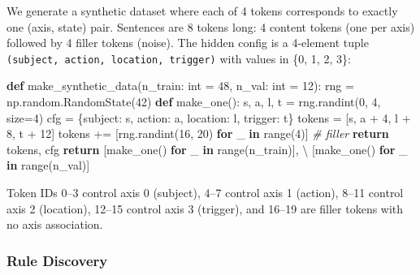 \documentclass[
  twocolumn,
  10pt,
  a4paper]{article}
\newenvironment{Shaded}{}{}
\newcommand{\BuiltInTok}[1]{\textcolor[rgb]{0.00,0.50,0.00}{#1}}
\newcommand{\CommentTok}[1]{\textcolor[rgb]{0.38,0.63,0.69}{\textit{#1}}}
\newcommand{\ControlFlowTok}[1]{\textcolor[rgb]{0.00,0.44,0.13}{\textbf{#1}}}
\newcommand{\DecValTok}[1]{\textcolor[rgb]{0.25,0.63,0.44}{#1}}
\newcommand{\KeywordTok}[1]{\textcolor[rgb]{0.00,0.44,0.13}{\textbf{#1}}}
\newcommand{\NormalTok}[1]{#1}
\newcommand{\OperatorTok}[1]{\textcolor[rgb]{0.40,0.40,0.40}{#1}}
\newcommand{\StringTok}[1]{\textcolor[rgb]{0.25,0.44,0.63}{#1}}
\begin{document}
We generate a synthetic dataset where each of 4 tokens corresponds to
exactly one (axis, state) pair. Sentences are 8 tokens long: 4 content
tokens (one per axis) followed by 4 filler tokens (noise). The hidden
config is a 4-element tuple
\texttt{(subject,\ action,\ location,\ trigger)} with values in \{0, 1,
2, 3\}:

\begin{Shaded}
\begin{Highlighting}[]
\KeywordTok{def}\NormalTok{ make\_synthetic\_data(n\_train: }\BuiltInTok{int} \OperatorTok{=} \DecValTok{48}\NormalTok{, n\_val: }\BuiltInTok{int} \OperatorTok{=} \DecValTok{12}\NormalTok{):}
\NormalTok{    rng }\OperatorTok{=}\NormalTok{ np.random.RandomState(}\DecValTok{42}\NormalTok{)}
    \KeywordTok{def}\NormalTok{ make\_one():}
\NormalTok{        s, a, l, t }\OperatorTok{=}\NormalTok{ rng.randint(}\DecValTok{0}\NormalTok{, }\DecValTok{4}\NormalTok{, size}\OperatorTok{=}\DecValTok{4}\NormalTok{)}
\NormalTok{        cfg }\OperatorTok{=}\NormalTok{ \{}\StringTok{\textquotesingle{}subject\textquotesingle{}}\NormalTok{: s, }\StringTok{\textquotesingle{}action\textquotesingle{}}\NormalTok{: a, }\StringTok{\textquotesingle{}location\textquotesingle{}}\NormalTok{: l, }\StringTok{\textquotesingle{}trigger\textquotesingle{}}\NormalTok{: t\}}
\NormalTok{        tokens }\OperatorTok{=}\NormalTok{ [s, a }\OperatorTok{+} \DecValTok{4}\NormalTok{, l }\OperatorTok{+} \DecValTok{8}\NormalTok{, t }\OperatorTok{+} \DecValTok{12}\NormalTok{]}
\NormalTok{        tokens }\OperatorTok{+=}\NormalTok{ [rng.randint(}\DecValTok{16}\NormalTok{, }\DecValTok{20}\NormalTok{) }\ControlFlowTok{for}\NormalTok{ \_ }\KeywordTok{in} \BuiltInTok{range}\NormalTok{(}\DecValTok{4}\NormalTok{)]  }\CommentTok{\# filler}
        \ControlFlowTok{return}\NormalTok{ tokens, cfg}
    \ControlFlowTok{return}\NormalTok{ [make\_one() }\ControlFlowTok{for}\NormalTok{ \_ }\KeywordTok{in} \BuiltInTok{range}\NormalTok{(n\_train)], }\OperatorTok{\textbackslash{}}
\NormalTok{           [make\_one() }\ControlFlowTok{for}\NormalTok{ \_ }\KeywordTok{in} \BuiltInTok{range}\NormalTok{(n\_val)]}
\end{Highlighting}
\end{Shaded}

Token IDs 0--3 control axis 0 (subject), 4--7 control axis 1 (action),
8--11 control axis 2 (location), 12--15 control axis 3 (trigger), and
16--19 are filler tokens with no axis association.

\hypertarget{rule-discovery}{%
\subsubsection{Rule Discovery}\label{rule-discovery}}
\end{document}
